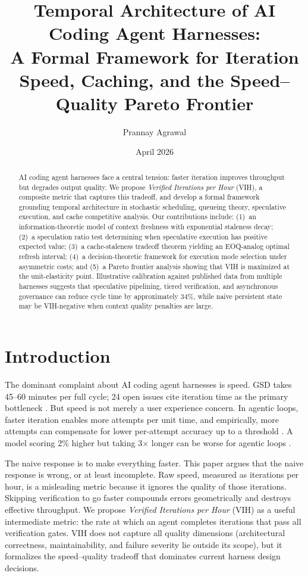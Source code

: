\documentclass[11pt,a4paper]{article}
\title{Temporal Architecture of AI Coding Agent Harnesses:\\
A Formal Framework for Iteration Speed, Caching, and the Speed--Quality Pareto Frontier}
\author{Prannay Agrawal}
\date{April 2026}
\theoremstyle{definition}
\theoremstyle{remark}
\begin{document}
\maketitle

\begin{abstract}
AI coding agent harnesses face a central tension: faster iteration improves throughput but degrades output quality. We propose \emph{Verified Iterations per Hour} (VIH), a composite metric that captures this tradeoff, and develop a formal framework grounding temporal architecture in stochastic scheduling, queueing theory, speculative execution, and cache competitive analysis. Our contributions include: (1)~an information-theoretic model of context freshness with exponential staleness decay; (2)~a speculation ratio test determining when speculative execution has positive expected value; (3)~a cache-staleness tradeoff theorem yielding an EOQ-analog optimal refresh interval; (4)~a decision-theoretic framework for execution mode selection under asymmetric costs; and (5)~a Pareto frontier analysis showing that VIH is maximized at the unit-elasticity point. Illustrative calibration against published data from multiple harnesses suggests that speculative pipelining, tiered verification, and asynchronous governance can reduce cycle time by approximately 34\%, while naive persistent state may be VIH-negative when context quality penalties are large.
\end{abstract}

\section{Introduction}\label{sec:intro}

The dominant complaint about AI coding agent harnesses is speed. GSD takes 45--60 minutes per full cycle; 24 open issues cite iteration time as the primary bottleneck \citep{iskohm2026comparison}. But speed is not merely a user experience concern. In agentic loops, faster iteration enables more attempts per unit time, and empirically, more attempts can compensate for lower per-attempt accuracy up to a threshold \citep{sweeffi2025}. A model scoring 2\% higher but taking 3$\times$ longer can be worse for agentic loops \citep{iskohm2026comparison}.

The naive response is to make everything faster. This paper argues that the naive response is wrong, or at least incomplete. Raw speed, measured as iterations per hour, is a misleading metric because it ignores the quality of those iterations. Skipping verification to go faster compounds errors geometrically and destroys effective throughput. We propose \emph{Verified Iterations per Hour} (VIH) as a useful intermediate metric: the rate at which an agent completes iterations that pass all verification gates. VIH does not capture all quality dimensions (architectural correctness, maintainability, and failure severity lie outside its scope), but it formalizes the speed--quality tradeoff that dominates current harness design decisions.
\end{document}
